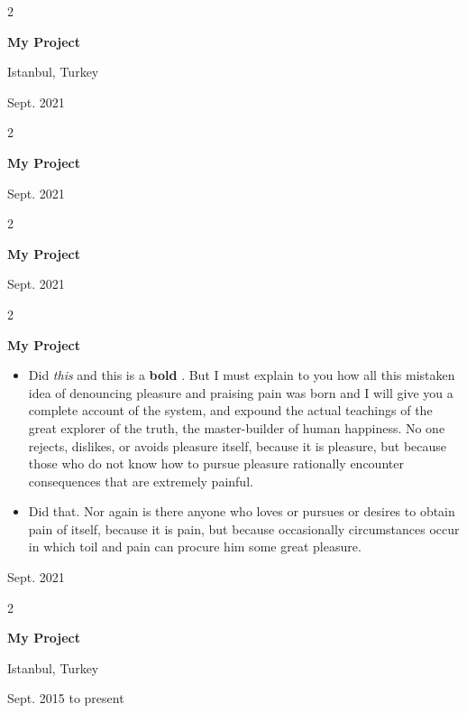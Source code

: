 \documentclass[10pt, letterpaper]{article}
\newenvironment{highlights}{
    \begin{itemize}[
        topsep=0.10 cm,
        parsep=0.10 cm,
        partopsep=0pt,
        itemsep=0pt,
        leftmargin=0.4 cm + 10pt
    ]
}{
    \end{itemize}
} %
\newenvironment{twocolentry}[2][]{
    \onecolentry
    \def\secondColumn{#2}
    \setcolumnwidth{\fill, 4.5 cm}
    \begin{paracol}{2}
}{
    \switchcolumn \raggedleft \secondColumn
    \end{paracol}
    \endonecolentry
} %
\let\hrefWithoutArrow\href
\renewcommand{\href}[2]{\hrefWithoutArrow{#1}{\mbox{\ifthenelse{\equal{#2}{}}{ }{#2 }\raisebox{.15ex}{\footnotesize \faExternalLink*}}}}
\begin{document}
        \vspace{0.2 cm}

        \begin{twocolentry}{
            Istanbul, Turkey

        Sept. 2021
        }
            \textbf{My Project}
        \end{twocolentry}


        \vspace{0.2 cm}

        \begin{twocolentry}{
            Sept. 2021
        }
            \textbf{My Project}
        \end{twocolentry}


        \vspace{0.2 cm}

        \begin{twocolentry}{
            Sept. 2021
        }
            \textbf{My Project}
        \end{twocolentry}


        \vspace{0.2 cm}

        \begin{twocolentry}{
            Sept. 2021
        }
            \textbf{My Project}
            \begin{highlights}
                \item Did \textit{this} and this is a \textbf{bold} \href{https://example.com}{link}. But I must explain to you how all this mistaken idea of denouncing pleasure and praising pain was born and I will give you a complete account of the system, and expound the actual teachings of the great explorer of the truth, the master-builder of human happiness. No one rejects, dislikes, or avoids pleasure itself, because it is pleasure, but because those who do not know how to pursue pleasure rationally encounter consequences that are extremely painful.
                \item Did that. Nor again is there anyone who loves or pursues or desires to obtain pain of itself, because it is pain, but because occasionally circumstances occur in which toil and pain can procure him some great pleasure.
            \end{highlights}
        \end{twocolentry}


        \vspace{0.2 cm}

        \begin{twocolentry}{
            Istanbul, Turkey

        Sept. 2015 to present
        }
            \textbf{My Project}
        \end{twocolentry}
\end{document}
